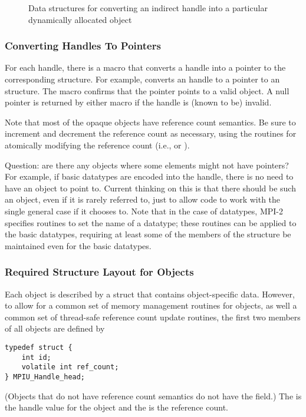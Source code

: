 \documentclass{article}
\begin{document}
\begin{figure}
\centerline{}
\caption{Data structures for converting an indirect handle into a particular
  dynamically allocated object}
\label{fig:indirect}
\end{figure}

\subsubsection{Converting Handles To Pointers}
\label{sec:handle-to-ptr}
For each handle, there is a macro  that converts a
handle into a pointer to the corresponding structure.  For example,
 converts an  handle to a
pointer to an
 structure.  The macro  confirms
that the pointer points to a valid object.
A null pointer is returned by either macro if the handle
is (known to be) invalid.

Note that most of the opaque objects have reference count semantics.
Be sure to increment and decrement the reference count as necessary,
using the routines for atomically modifying the reference count (i.e.,
 or ). 

Question: are there any objects where some elements might not have
pointers?  For example, if basic datatypes are encoded into the
handle, there is no need to have an object to point to.  Current
thinking on this is that there should be such an object, even if it is
rarely referred to, just to allow code to work with the single general
case if it chooses to.  Note that in the case of datatypes, MPI-2
specifies routines to set the name of a datatype; these routines can
be applied to the basic datatypes, requiring at least some of the
members of the  structure be maintained even for
the basic datatypes.

\subsubsection{Required Structure Layout for Objects}
Each object is described by a struct that contains object-specific
data.  However, to allow for a common set of memory management
routines for objects, as well a common set of thread-safe reference
count update routines, the first two members of all objects are
defined by
\begin{verbatim}
typedef struct {
    int id;
    volatile int ref_count;
} MPIU_Handle_head;
\end{verbatim}
(Objects that do not have reference count semantics do not have the
 field.)  The  is the handle value for the
object and the  is the reference count.
\end{document}

